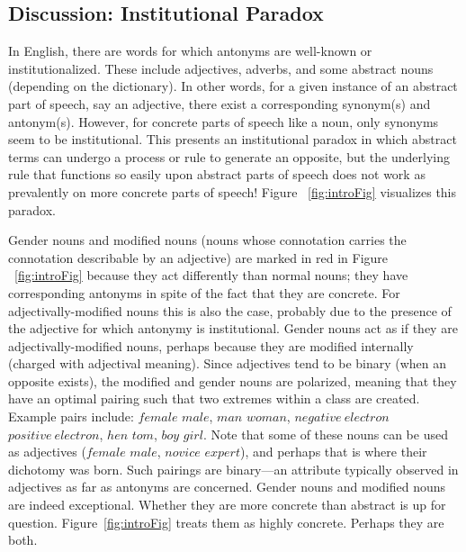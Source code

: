 \subsection {Discussion: Institutional Paradox}
\label{paradox} 
In English, there are words for which antonyms are well-known or institutionalized.  These include adjectives, adverbs, and some abstract nouns (depending on the dictionary).  In other words, for a given instance of an abstract part of speech, say an adjective, there exist a corresponding synonym(s) and antonym(s).  However, for concrete parts of speech like a noun, only synonyms seem to be institutional. This presents an institutional paradox in which abstract terms can undergo a process or rule to generate an opposite, but the underlying rule that functions so easily upon abstract parts of speech does not work as prevalently on more concrete parts of speech!  Figure ~\ref{fig:introFig} visualizes this paradox.

Gender nouns and modified nouns (nouns whose connotation carries the connotation describable by an adjective) are marked in red in Figure ~\ref{fig:introFig} because they act differently than normal nouns; they have corresponding antonyms in spite of the fact that they are concrete.  For adjectivally-modified nouns this is also the case, probably due to the presence of the adjective for which antonymy is institutional.  Gender nouns act as if they are adjectivally-modified nouns, perhaps because they are modified internally (charged with adjectival meaning).  Since adjectives tend to be binary (when an opposite exists), the modified and gender nouns are polarized, meaning that they have an optimal pairing such that two extremes within a class are created.  Example pairs include: $female$ \opp $male$, $man$ \opp $woman$, $negative~electron$ \opp $positive~electron$, $hen$ \opp $tom$, $boy$ \opp $girl$.  Note that some of these nouns can be used as adjectives ($female$ \opp $male$, $novice$ \opp $expert$), and perhaps that is where their dichotomy was born.  Such pairings are binary---an attribute typically observed in adjectives as far as antonyms are concerned.  Gender nouns and modified nouns are indeed exceptional.  Whether they are more concrete than abstract is up for question.  Figure~\ref{fig:introFig} treats them as highly concrete.  Perhaps they are both.    

